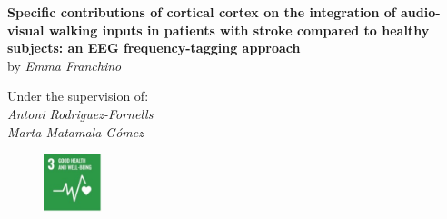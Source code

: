 \begin{titlepage}
\vspace{15mm}
\begin{center}
  {\Large\textbf{Specific contributions of cortical cortex on the integration of audio-visual walking inputs in patients with stroke compared to healthy subjects: an EEG frequency-tagging approach}}
  \vspace{15mm}
  \\ {\Large{by \textit{Emma Franchino}}}
\end{center}
\vspace{17mm}

\begin{center}
  {\Large{{Under the supervision of:}\\ \textit{Antoni Rodriguez-Fornells \\ Marta Matamala-Gómez}}}
\end{center}

\vspace{4mm}
\begin{figure}[h]
    \centering
    \includegraphics[width=0.15\textwidth]{images/Picture 1.jpg}
\end{figure}

\end{titlepage}